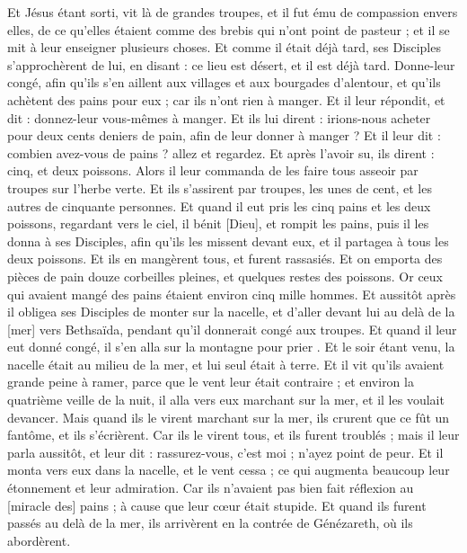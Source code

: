 \begin{multicols}{2}
Et Jésus étant sorti, vit là de grandes troupes, et il fut ému de compassion envers elles, de ce qu'elles étaient comme des brebis qui n'ont point de pasteur ; et il se mit à leur enseigner plusieurs choses.
Et comme il était déjà tard, ses Disciples s'approchèrent de lui, en disant : ce lieu est désert, et il est déjà tard.
Donne-leur congé, afin qu'ils s'en aillent aux villages et aux bourgades d'alentour, et qu'ils achètent des pains pour eux ; car ils n'ont rien à manger.
Et il leur répondit, et dit : donnez-leur vous-mêmes à manger. Et ils lui dirent : irions-nous acheter pour deux cents deniers de pain, afin de leur donner à manger ?
Et il leur dit : combien avez-vous de pains ? allez et regardez. Et après l'avoir su, ils dirent : cinq, et deux poissons.
Alors il leur commanda de les faire tous asseoir par troupes sur l'herbe verte.
Et ils s'assirent par troupes, les unes de cent, et les autres de cinquante personnes.
Et quand il eut pris les cinq pains et les deux poissons, regardant vers le ciel, il bénit [Dieu], et rompit les pains, puis il les donna à ses Disciples, afin qu'ils les missent devant eux, et il partagea à tous les deux poissons.
Et ils en mangèrent tous, et furent rassasiés.
Et on emporta des pièces de pain douze corbeilles pleines, et quelques restes des poissons.
Or ceux qui avaient mangé des pains étaient environ cinq mille hommes.
Et aussitôt après il obligea ses Disciples de monter sur la nacelle, et d'aller devant lui au delà de la [mer] vers Bethsaïda, pendant qu'il donnerait congé aux troupes.
Et quand il leur eut donné congé, il s'en alla sur la montagne pour prier .
Et le soir étant venu, la nacelle était au milieu de la mer, et lui seul était à terre.
Et il vit qu'ils avaient grande peine à ramer, parce que le vent leur était contraire ; et environ la quatrième veille de la nuit, il alla vers eux marchant sur la mer, et il les voulait devancer.
Mais quand ils le virent marchant sur la mer, ils crurent que ce fût un fantôme, et ils s'écrièrent.
Car ils le virent tous, et ils furent troublés ; mais il leur parla aussitôt, et leur dit : rassurez-vous, c'est moi ; n'ayez point de peur.
Et il monta vers eux dans la nacelle, et le vent cessa ; ce qui augmenta beaucoup leur étonnement et leur admiration.
Car ils n'avaient pas bien fait réflexion au [miracle des] pains ; à cause que leur cœur était stupide.
Et quand ils furent passés au delà de la mer, ils arrivèrent en la contrée de Génézareth, où ils abordèrent.

\end{multicols}
